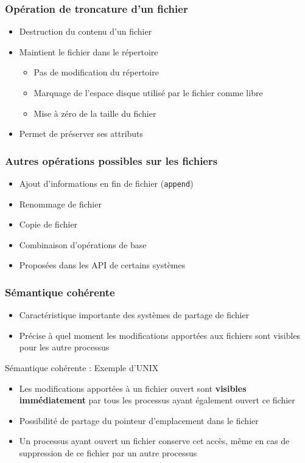 \begin{frame}
\frametitle{Opération de troncature d'un fichier}
\begin{itemize}
\item Destruction du contenu d'un fichier
\item Maintient le fichier dans le répertoire
\begin{itemize}
\item Pas de modification du répertoire
\item Marquage de l'espace disque utilisé par le fichier comme libre
\item Mise à zéro de la taille du fichier
\end{itemize}
\item Permet de préserver ses attributs
\end{itemize}
\end{frame}


\begin{frame}
\frametitle{Autres opérations possibles sur les fichiers}
\begin{itemize}
\item Ajout d'informations en fin de fichier (\texttt{append})
\item Renommage de fichier
\item Copie de fichier
\end{itemize}
\begin{itemize}
\item Combinaison d'opérations de base
\item Proposées dans les API de certains systèmes
\end{itemize}
\end{frame}



\begin{frame}
\frametitle{Sémantique cohérente}
\begin{itemize}
\item Caractéristique importante des systèmes de partage de fichier
\item Précise à quel moment les modifications apportées aux fichiers sont visibles pour les autre processus
\end{itemize}
\begin{exampleblock}{Sémantique cohérente : Exemple d'UNIX}
\begin{itemize}
\item Les modifications apportées à un fichier ouvert sont \textbf{visibles immédiatement} par tous les processus ayant également ouvert ce fichier
\item Possibilité de partage du pointeur d'emplacement dans le fichier
\item Un processus ayant ouvert un fichier conserve cet accès, même en cas de suppression de ce fichier par un autre processus
\end{itemize}
\end{exampleblock}
\end{frame}


